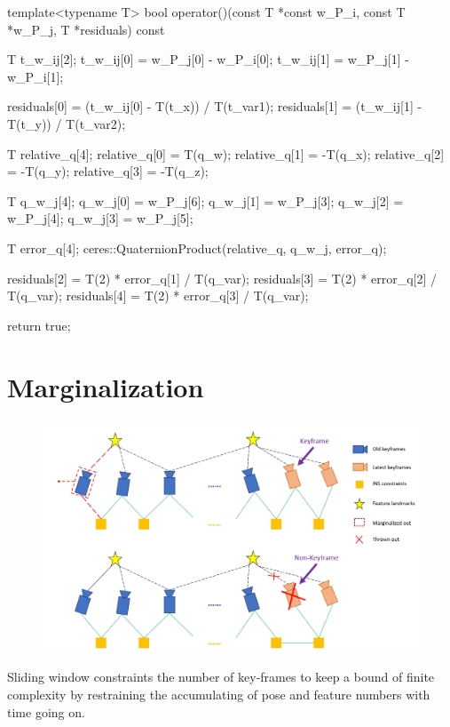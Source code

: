 \documentclass[12pt]{report}   %
\begin{document}
\begin{cppcode}
template<typename T>
bool operator()(const T *const w_P_i, const T *w_P_j, T *residuals) const {
	T t_w_ij[2];
	t_w_ij[0] = w_P_j[0] - w_P_i[0];
	t_w_ij[1] = w_P_j[1] - w_P_i[1];
	
	residuals[0] = (t_w_ij[0] - T(t_x)) / T(t_var1);
	residuals[1] = (t_w_ij[1] - T(t_y)) / T(t_var2);
	
	T relative_q[4];
	relative_q[0] = T(q_w);
	relative_q[1] = -T(q_x);
	relative_q[2] = -T(q_y);
	relative_q[3] = -T(q_z);
	
	T q_w_j[4];
	q_w_j[0] = w_P_j[6];
	q_w_j[1] = w_P_j[3];
	q_w_j[2] = w_P_j[4];
	q_w_j[3] = w_P_j[5];
	
	T error_q[4];
	ceres::QuaternionProduct(relative_q, q_w_j, error_q);
	
	residuals[2] = T(2) * error_q[1] / T(q_var);
	residuals[3] = T(2) * error_q[2] / T(q_var);
	residuals[4] = T(2) * error_q[3] / T(q_var);
	
	return true;
}

\end{cppcode}




\section{Marginalization}

\begin{figure}[htbp]
	\centering
	\includegraphics[scale=0.5]{figures/marginalization.png}
\end{figure}

Sliding window constraints the number of key-frames to keep a bound of finite complexity by restraining the accumulating of pose and feature numbers with time going on.
\end{document}
